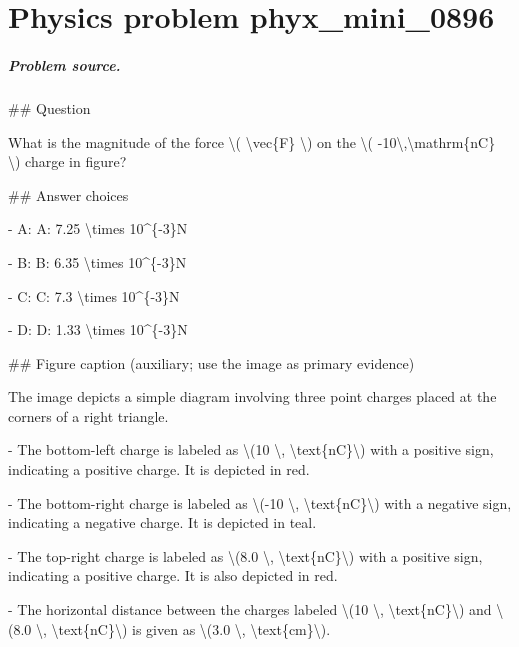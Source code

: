
\chapter{Physics problem phyx\_mini\_0896}
\label{ch:PhyXMiniProblems_problem_phyx_mini_0896}

\paragraph{Problem source.}
\#\# Question

What is the magnitude of the force \textbackslash{}( \textbackslash{}vec\{F\} \textbackslash{}) on the \textbackslash{}( -10\textbackslash{},\textbackslash{}mathrm\{nC\} \textbackslash{}) charge in figure?

\#\# Answer choices

- A: A: 7.25 \textbackslash{}times 10\textasciicircum{}\{-3\}N

- B: B: 6.35 \textbackslash{}times 10\textasciicircum{}\{-3\}N

- C: C: 7.3 \textbackslash{}times 10\textasciicircum{}\{-3\}N

- D: D: 1.33 \textbackslash{}times 10\textasciicircum{}\{-3\}N

\#\# Figure caption (auxiliary; use the image as primary evidence)

The image depicts a simple diagram involving three point charges placed at the corners of a right triangle. 

- The bottom-left charge is labeled as \textbackslash{}(10 \textbackslash{}, \textbackslash{}text\{nC\}\textbackslash{}) with a positive sign, indicating a positive charge. It is depicted in red.

- The bottom-right charge is labeled as \textbackslash{}(-10 \textbackslash{}, \textbackslash{}text\{nC\}\textbackslash{}) with a negative sign, indicating a negative charge. It is depicted in teal.

- The top-right charge is labeled as \textbackslash{}(8.0 \textbackslash{}, \textbackslash{}text\{nC\}\textbackslash{}) with a positive sign, indicating a positive charge. It is also depicted in red.

- The horizontal distance between the charges labeled \textbackslash{}(10 \textbackslash{}, \textbackslash{}text\{nC\}\textbackslash{}) and \textbackslash{}(8.0 \textbackslash{}, \textbackslash{}text\{nC\}\textbackslash{}) is given as \textbackslash{}(3.0 \textbackslash{}, \textbackslash{}text\{cm\}\textbackslash{}).

